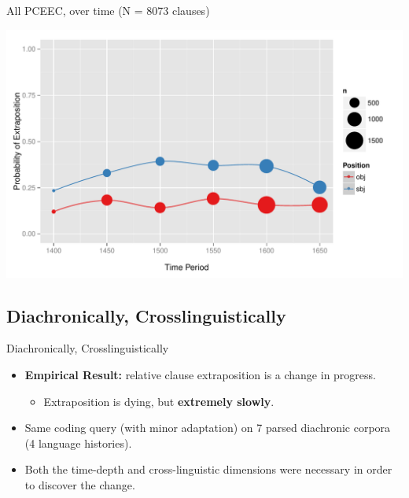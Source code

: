 \documentclass[hyperref={pdfpagelabels=false}]{beamer}
\begin{document}


\begin{frame}{All PCEEC, over time (N = 8073 clauses)}

\begin{center}
\includegraphics[width=1.1\textwidth]{exSbjObjYearBinned50.pdf}
\end{center}
\end{frame}


 \subsection{Diachronically, Crosslinguistically}

\begin{frame}{Diachronically, Crosslinguistically}
\begin{itemize}

    \item \textbf{Empirical Result:} relative clause extraposition is a change in progress.
        \begin{itemize}
        \item Extraposition is dying, but \textbf{extremely slowly}.
        \end{itemize}
    \item Same coding query (with minor adaptation) on 7 parsed diachronic corpora (4 language histories).
    \item Both the time-depth and cross-linguistic dimensions were necessary in order to discover the change.
    \end{itemize}
\end{frame}
\end{document}
